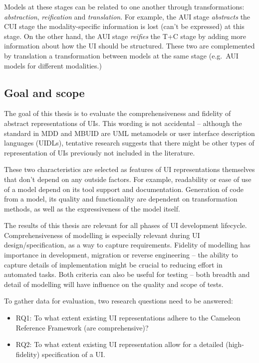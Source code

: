 Models at these stages can be related to one another through transformations: \emph{abstraction}, \emph{reification} and \emph{translation}.
For example, the AUI stage \emph{abstracts} the CUI stage\,\textemdash\,the modality-specific information is lost (can't be expressed) at this stage.
On the other hand, the AUI stage \emph{reifies} the T+C stage by adding more information about how the UI should be structured.
These two are complemented by translation\,\textemdash\,a transformation between models at the same stage (e.g.\ AUI models for different modalities.)

\subsection{Goal and scope}\label{subsec:goal-and-scope}
The goal of this thesis is to evaluate the comprehensiveness and fidelity of abstract representations of UIs.
This wording is not accidental – although the standard in MDD and MBUID are UML metamodels or user interface description languages (UIDLs), tentative research suggests that there might be other types of representation of UIs previously not included in the literature.

These two characteristics are selected as features of UI representations themselves that don’t depend on any outside factors.
For example, readability or ease of use of a model depend on its tool support and documentation.
Generation of code from a model, its quality and functionality are dependent on transformation methods, as well as the expressiveness of the model itself.

The results of this thesis are relevant for all phases of UI development lifecycle.
Comprehensiveness of modelling is especially relevant during UI design/specification, as a way to capture requirements.
Fidelity of modelling has importance in development, migration or reverse engineering – the ability to capture details of implementation might be crucial to reducing effort in automated tasks.
Both criteria can also be useful for testing – both breadth and detail of modelling will have influence on the quality and scope of tests.

To gather data for evaluation, two research questions need to be answered:
\begin{itemize}
    \item RQ1: To what extent existing UI representations adhere to the Cameleon Reference Framework (are comprehensive)?
    \item RQ2: To what extent existing UI representation allow for a detailed (high-fidelity) specification of a UI.
\end{itemize}

